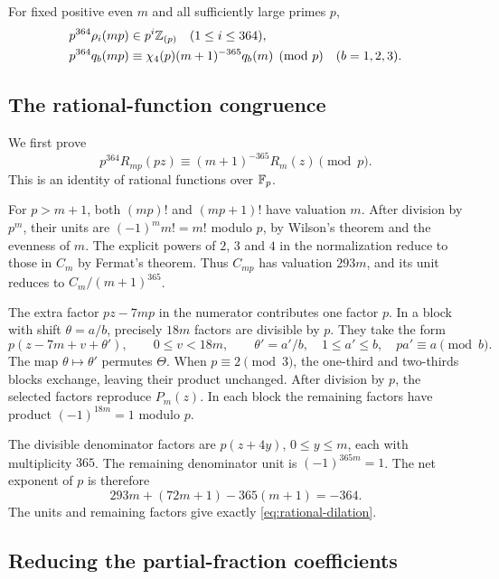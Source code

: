 \begin{proposition}\label{prop:dilation}
For fixed positive even $m$ and all sufficiently large primes $p$,
\begin{align}
 p^{364}\rho_i(mp)&\in p^i\mathbb Z_{(p)} \quad(1\leq i\leq364),
                                      \label{eq:rho-dilation}\\
 p^{364}q_b(mp)&\equiv\chi_4(p)(m+1)^{-365}q_b(m)\pmod p
                        \quad(b=1,2,3).\label{eq:q-dilation}
\end{align}
\end{proposition}

\subsection{The rational-function congruence}

We first prove
\begin{equation}\label{eq:rational-dilation}
 p^{364}R_{mp}(pz)\equiv(m+1)^{-365}R_m(z)\pmod p.
\end{equation}
This is an identity of rational functions over $\mathbb F_p$.

For $p>m+1$, both $(mp)!$ and $(mp+1)!$ have valuation $m$.
After division by $p^m$, their units are $(-1)^m m!=m!$ modulo $p$,
by Wilson's theorem and the evenness of $m$. The explicit powers of
$2$, $3$ and $4$ in the normalization reduce to those in $C_m$ by
Fermat's theorem. Thus $C_{mp}$ has valuation $293m$,
and its unit reduces to $C_m/(m+1)^{365}$.

The extra factor $pz-7mp$ in the numerator contributes one factor $p$.
In a block with shift $\theta=a/b$, precisely $18m$ factors are divisible
by $p$. They take the form
\[
 p(z-7m+v+\theta'),\qquad 0\leq v<18m,
 \qquad \theta'=a'/b,\quad 1\leq a'\leq b,\quad pa'\equiv a\pmod b.
\]
The map $\theta\mapsto\theta'$ permutes $\Theta$. When $p\equiv2\pmod3$,
the one-third and two-thirds blocks exchange, leaving their product
unchanged. After division by $p$, the selected factors reproduce
$P_m(z)$. In each block the remaining factors have product
$(-1)^{18m}=1$ modulo $p$.

The divisible denominator factors are $p(z+4y)$, $0\leq y\leq m$,
each with multiplicity $365$. The remaining denominator unit is
$(-1)^{365m}=1$. The net exponent of $p$ is therefore
\[
 293m+(72m+1)-365(m+1)=-364.
\]
The units and remaining factors give exactly \eqref{eq:rational-dilation}.

\subsection{Reducing the partial-fraction coefficients}

